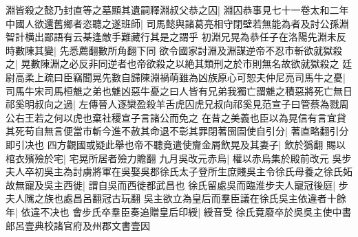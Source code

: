 淵皆殺之懿乃封直等之墓顯其遺嗣釋淵叔父恭之囚|{
	淵囚恭事見七十一卷太和二年}
中國人欲還舊鄉者恣聽之遂班師|{
	司馬懿與諸葛亮相守閉壁若無能為者及討公孫淵智計横出鄙語有云棊逢敵手難藏行其是之謂乎}
初淵兄晃為恭任子在洛陽先淵未反時數陳其變|{
	先悉薦翻數所角翻下同}
欲令國家討淵及淵謀逆帝不忍市斬欲就獄殺之|{
	晃數陳淵之必反非同逆者也帝欲殺之以絶其類刑之於市則無名故欲就獄殺之}
廷尉高柔上疏曰臣竊聞晃先數自歸陳淵禍萌雖為凶族原心可恕夫仲尼亮司馬牛之憂|{
	司馬牛宋司馬桓魋之弟也魋凶惡牛憂之曰人皆有兄弟我獨亡謂魋之積惡將死亡無日}
祁奚明叔向之過|{
	左傳晉人逐欒盈殺羊舌虎囚虎兄叔向祁奚見范宣子曰管蔡為戮周公右王若之何以虎也棄社稷宣子言諸公而免之}
在昔之美義也臣以為晃信有言宜貸其死苟自無言便當市斬今進不赦其命退不彰其罪閉著囹圄使自引分|{
	著直略翻引分即引决也}
四方觀國或疑此舉也帝不聽竟遣使齎金屑飲晃及其妻子|{
	飲於㺔翻}
賜以棺衣殯殮於宅|{
	宅晃所居者殮力贍翻}
九月吳改元赤烏|{
	權以赤烏集於殿前改元}
吳步夫人卒初吳主為討虜將軍在吳娶吳郡徐氏太子登所生庶賤吳主令徐氏母養之徐氏妬故無寵及吳主西徙|{
	謂自吳而西徙都武昌也}
徐氏留處吳而臨淮步夫人寵冠後庭|{
	步夫人隲之族也處昌呂翻冠古玩翻}
吳主欲立為皇后而羣臣議在徐氏吳主依違者十餘年|{
	依違不决也}
會步氏卒羣臣奏追贈皇后印綬|{
	綬音受}
徐氏竟廢卒於吳吳主使中書郎呂壹典校諸官府及州郡文書壹因

